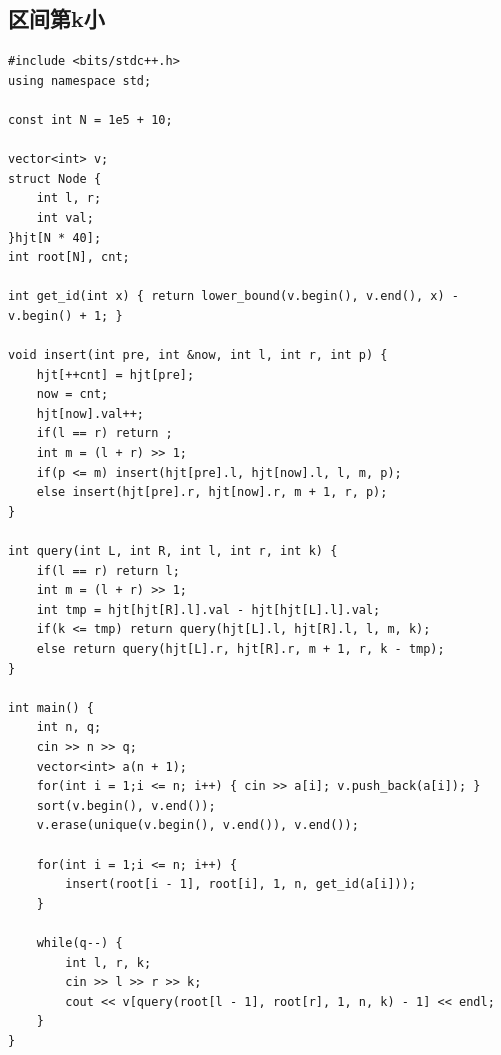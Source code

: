 \documentclass[twoside]{article}
\begin{document}
\subsection{区间第k小}
\begin{lstlisting}
#include <bits/stdc++.h>
using namespace std;

const int N = 1e5 + 10;

vector<int> v;
struct Node {
    int l, r;
    int val;
}hjt[N * 40];
int root[N], cnt;

int get_id(int x) { return lower_bound(v.begin(), v.end(), x) - v.begin() + 1; }

void insert(int pre, int &now, int l, int r, int p) {
    hjt[++cnt] = hjt[pre];
    now = cnt;
    hjt[now].val++;
    if(l == r) return ;
    int m = (l + r) >> 1;
    if(p <= m) insert(hjt[pre].l, hjt[now].l, l, m, p);
    else insert(hjt[pre].r, hjt[now].r, m + 1, r, p);
}

int query(int L, int R, int l, int r, int k) {
    if(l == r) return l;
    int m = (l + r) >> 1;
    int tmp = hjt[hjt[R].l].val - hjt[hjt[L].l].val;
    if(k <= tmp) return query(hjt[L].l, hjt[R].l, l, m, k);
    else return query(hjt[L].r, hjt[R].r, m + 1, r, k - tmp); 
}

int main() {
    int n, q;
    cin >> n >> q;
    vector<int> a(n + 1);
    for(int i = 1;i <= n; i++) { cin >> a[i]; v.push_back(a[i]); }
    sort(v.begin(), v.end());
    v.erase(unique(v.begin(), v.end()), v.end());

    for(int i = 1;i <= n; i++) {
        insert(root[i - 1], root[i], 1, n, get_id(a[i]));
    }

    while(q--) {
        int l, r, k;
        cin >> l >> r >> k;
        cout << v[query(root[l - 1], root[r], 1, n, k) - 1] << endl;
    }
}
\end{lstlisting}
\end{document}
